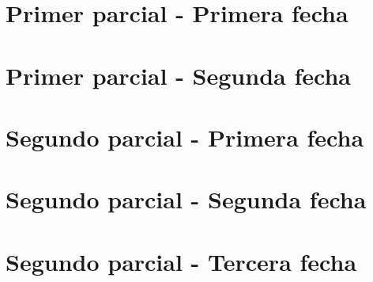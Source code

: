 \section{Primer parcial - Primera fecha}
\section{Primer parcial - Segunda fecha}
\section{Segundo parcial - Primera fecha}
\section{Segundo parcial - Segunda fecha}
\section{Segundo parcial - Tercera fecha}